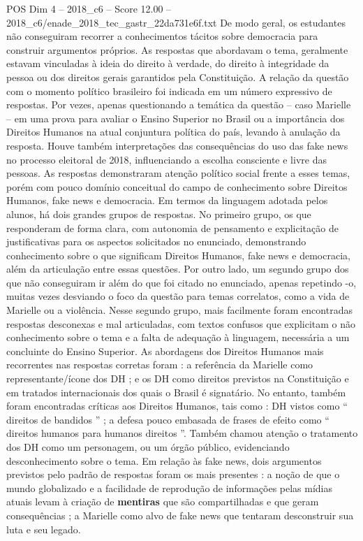 \begin{textsample}{POS Dim 4 – 2018\_c6 – Score 12.00 – 2018\_c6/enade\_2018\_tec\_gastr\_22da731e6f.txt}
De modo geral, os estudantes não conseguiram recorrer a conhecimentos tácitos sobre democracia para construir argumentos próprios.
As respostas que abordavam o tema, geralmente estavam vinculadas à ideia do direito à verdade, do direito à integridade da pessoa ou dos direitos gerais garantidos pela Constituição.
A relação da questão com o momento político brasileiro foi indicada em um número expressivo de respostas.
Por vezes, apenas questionando a temática da questão – caso Marielle – em uma prova para avaliar o Ensino Superior no Brasil ou a importância dos Direitos Humanos na atual conjuntura política do país, levando à anulação da resposta.
Houve também interpretações das consequências do uso das fake news no processo eleitoral de 2018, influenciando a escolha consciente e livre das pessoas.
As respostas demonstraram atenção político social frente a esses temas, porém com pouco domínio conceitual do campo de conhecimento sobre Direitos Humanos, fake news e democracia.
Em termos da linguagem adotada pelos alunos, há dois grandes grupos de respostas.
No primeiro grupo, os que responderam de forma clara, com autonomia de pensamento e explicitação de justificativas para os aspectos solicitados no enunciado, demonstrando conhecimento sobre o que significam Direitos Humanos, fake news e democracia, além da articulação entre essas questões.
Por outro lado, um segundo grupo dos que não conseguiram ir além do que foi citado no enunciado, apenas repetindo -o, muitas vezes desviando o foco da questão para temas correlatos, como a vida de Marielle ou a violência.
Nesse segundo grupo, mais facilmente foram encontradas respostas desconexas e mal articuladas, com textos confusos que explicitam o não conhecimento sobre o tema e a falta de adequação à linguagem, necessária a um concluinte do Ensino Superior.
As abordagens dos Direitos Humanos mais recorrentes nas respostas corretas foram : a referência da Marielle como representante/ícone dos DH ; e os DH como direitos previstos na Constituição e em tratados internacionais dos quais o Brasil é signatário.
No entanto, também foram encontradas críticas aos Direitos Humanos, tais como : DH vistos como “ direitos de bandidos ” ; a defesa pouco embasada de frases de efeito como “ direitos humanos para humanos direitos ”.
Também chamou atenção o tratamento dos DH como um personagem, ou um órgão público, evidenciando desconhecimento sobre o tema.
Em relação às fake news, dois argumentos previstos pelo padrão de respostas foram os mais presentes : a noção de que o mundo globalizado e a facilidade de reprodução de informações pelas mídias atuais levam à criação de \textbf{mentiras} que são compartilhadas e que geram consequências ; a Marielle como alvo de fake news que tentaram desconstruir sua luta e seu legado.

\end{textsample}
